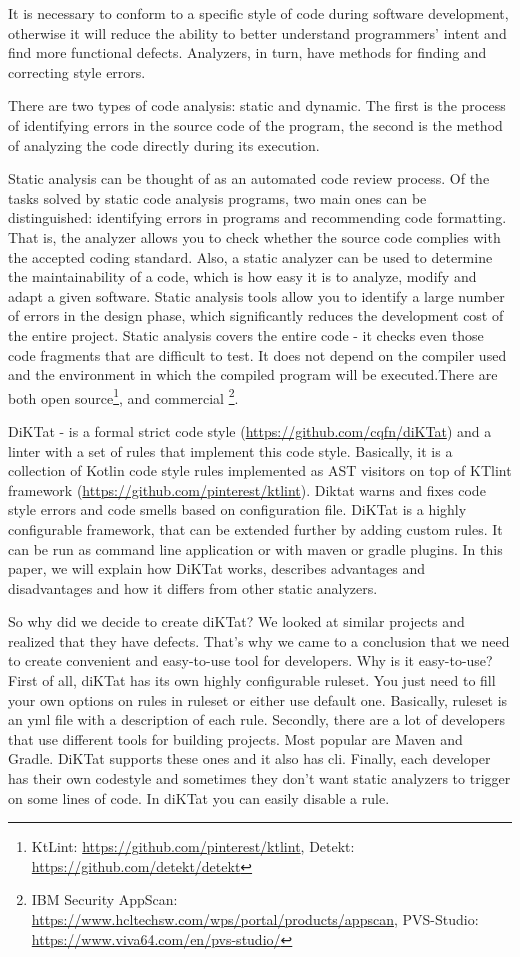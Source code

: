 It is necessary to conform to a specific style of code during software development, otherwise it will reduce the ability to better understand programmers’ intent and
ﬁnd more functional defects. Analyzers, in turn, have methods for finding and correcting style errors.

There are two types of code analysis: static and dynamic. The first is the process of identifying errors in the source code of the program, the second is the method
 of analyzing the code directly during its execution.

Static analysis can be thought of as an automated code review process. Of the tasks solved by static code analysis programs, two main ones can be
distinguished: identifying errors in programs and recommending code formatting. That is, the analyzer allows you to check whether the source code complies with the
accepted coding standard. Also, a static analyzer can be used to determine the maintainability of a code, which is how easy it is to analyze, modify and adapt a given
software. Static analysis tools allow you to identify a large number of errors in the design phase, which significantly reduces the development cost of the entire project.
Static analysis covers the entire code - it checks even those code fragments that are difficult to test. It does not depend on the compiler used and the environment
in which the compiled program will be executed.There are both open source\footnote{KtLint: \url{https://github.com/pinterest/ktlint},
Detekt: \url{https://github.com/detekt/detekt}}, and commercial \footnote{IBM Security AppScan: \url{https://www.hcltechsw.com/wps/portal/products/appscan},
PVS-Studio: \url{https://www.viva64.com/en/pvs-studio/}}.

DiKTat - is a formal strict code style (\url{https://github.com/cqfn/diKTat}) and a linter with a set of rules that implement this code style. Basically, it is a collection
of Kotlin code style rules implemented as AST visitors on top of KTlint framework (\url{https://github.com/pinterest/ktlint}). Diktat warns and fixes code style errors and
code smells based on configuration file. DiKTat is a highly configurable framework, that can be extended further by adding custom rules. It can be run as command line
application or with maven or gradle plugins. In this paper, we will explain how DiKTat works, describes advantages and disadvantages and how it differs from other static
analyzers.

So why did we decide to create diKTat? We looked at similar projects and realized that they have defects. That’s why we came to a conclusion that we need to create
convenient and easy-to-use tool for developers. Why is it easy-to-use? First of all, diKTat has its own highly configurable ruleset. You just need to fill your own options
on rules in ruleset or either use default one. Basically, ruleset is an yml file with a description of each rule. Secondly, there are a lot of developers that use different
tools for building projects. Most popular are Maven and Gradle. DiKTat supports these ones and it also has cli. Finally, each developer has their own codestyle and sometimes
they don’t want static analyzers to trigger on some lines of code. In diKTat you can easily disable a rule.

